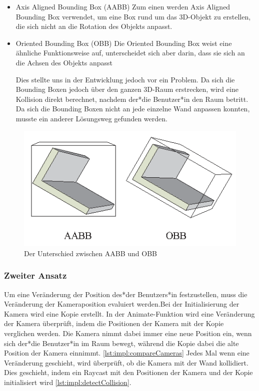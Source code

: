 \begin{itemize}
    \item Axis Aligned Bounding Box (AABB)
    \newline
    Zum einen werden Axis Aligned Bounding Box verwendet, um eine Box rund um das 3D-Objekt zu erstellen, die sich nicht an die Rotation des Objekts anpasst.
    \item Oriented Bounding Box (OBB)
    \newline
    Die Oriented Bounding Box weist eine ähnliche Funktionsweise auf, unterscheidet sich aber darin, dass sie sich an die Achsen des Objekts anpasst
    
    Dies stellte uns in der Entwicklung jedoch vor ein Problem. Da sich die Bounding Boxen jedoch über den ganzen 3D-Raum erstrecken, wird eine Kollision direkt berechnet, nachdem der*die Benutzer*in den Raum betritt. Da sich die Bounding Boxen nicht an jede einzelne Wand anpassen konnten, musste ein anderer Lösungsweg gefunden werden.
\end{itemize}
\begin{figure}
    \centering
    \includegraphics[scale=0.65]{pics/aabb_obb.png}
    \caption{Der Unterschied zwischen AABB und OBB \cite{AABBandOBBPicture}}
    \label{fig:impl:aabb_obb}
\end{figure}


\subsubsection{Zweiter Ansatz}
Um eine Veränderung der Position des*der Benutzers*in festzustellen, muss die Veränderung der Kameraposition evaluiert werden.Bei der Initialisierung der Kamera wird eine Kopie erstellt. In der Animate-Funktion wird eine Veränderung der Kamera überprüft, indem die Positionen der Kamera mit der Kopie verglichen werden. Die Kamera nimmt dabei immer eine neue Position ein, wenn sich der*die Benutzer*in im Raum bewegt, während die Kopie dabei die alte Position der Kamera einnimmt. \ref{lst:impl:compareCameras} Jedes Mal wenn eine Veränderung geschieht, wird überprüft, ob die Kamera mit der Wand kollidiert. Dies geschieht, indem ein Raycast mit den Positionen der Kamera und der Kopie initialisiert wird \ref{lst:impl:detectCollision}. 
     

